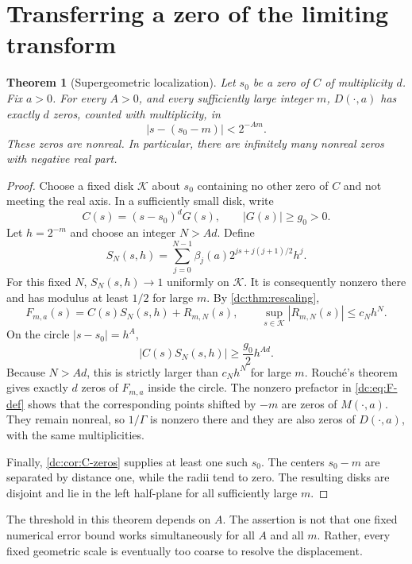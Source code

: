 \documentclass[11pt,a4paper,oneside,openany]{book}
\numberwithin{equation}{chapter}
\newtheorem{theorem}{Theorem}[chapter]
\theoremstyle{definition}
\theoremstyle{remark}
\newcommand{\abs}[1]{\left\lvert #1\right\rvert}
\begin{document}
\section{Transferring a zero of the limiting transform}
\begin{theorem}[Supergeometric localization]
\label{dc:thm:zero-strings}
Let $s_0$ be a zero of $C$ of multiplicity $d$. Fix $a>0$.
For every $A>0$, and every sufficiently large integer $m$,
$D(\cdot,a)$ has exactly $d$ zeros, counted with multiplicity, in
\begin{equation}
 \abs{s-(s_0-m)}<2^{-Am}.
 \label{dc:eq:zero-disk}
\end{equation}
These zeros are nonreal. In particular, there are infinitely many
nonreal zeros with negative real part.
\end{theorem}
\begin{proof}
Choose a fixed disk $\mathcal K$ about $s_0$ containing no other zero
of $C$ and not meeting the real axis. In a sufficiently small disk,
write
\[
 C(s)=(s-s_0)^dG(s),\qquad \abs{G(s)}\ge g_0>0.
\]
Let $h=2^{-m}$ and choose an integer $N>Ad$. Define
\[
 S_N(s,h)=\sum_{j=0}^{N-1}
      \beta_j(a)2^{js+j(j+1)/2}h^j.
\]
For this fixed $N$, $S_N(s,h)\to1$ uniformly on $\mathcal K$.
It is consequently nonzero there and has modulus at least $1/2$
for large $m$. By \cref{dc:thm:rescaling},
\[
 F_{m,a}(s)=C(s)S_N(s,h)+R_{m,N}(s),\qquad
 \sup_{s\in\mathcal K}\abs{R_{m,N}(s)}\le c_Nh^N.
\]
On the circle $\abs{s-s_0}=h^A$,
\[
 \abs{C(s)S_N(s,h)}\ge\frac{g_0}{2}h^{Ad}.
\]
Because $N>Ad$, this is strictly larger than $c_Nh^N$ for large
$m$. Rouch\'e's theorem gives exactly $d$ zeros of $F_{m,a}$ inside
the circle. The nonzero prefactor in \cref{dc:eq:F-def} shows that the
corresponding points shifted by $-m$ are zeros of $M(\cdot,a)$.
They remain nonreal, so $1/\Gamma$ is nonzero there and they are
also zeros of $D(\cdot,a)$, with the same multiplicities.

Finally, \cref{dc:cor:C-zeros} supplies at least one such $s_0$.
The centers $s_0-m$ are separated by distance one, while the radii
tend to zero. The resulting disks are disjoint and lie in the left
half-plane for all sufficiently large $m$.
\end{proof}

The threshold in this theorem depends on $A$. The assertion is not
that one fixed numerical error bound works simultaneously for all
$A$ and all $m$. Rather, every fixed geometric scale is eventually
too coarse to resolve the displacement.
\end{document}
